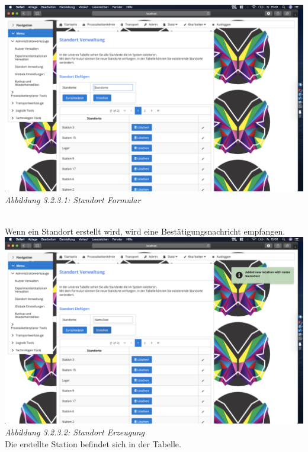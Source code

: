 \documentclass[enabledeprecatedfontcommands,fontsize=12pt,paper=a4,twoside]{scrartcl}
\begin{document}
\hypertarget{sc3.1.4.1}{
\includegraphics[width=1\textwidth]{Screenshots/4StandOrtFormular.png}
\textit{Abbildung 3.2.3.1: Standort Formular}
} \\

Wenn ein Standort erstellt wird, wird eine Bestätigungsnachricht empfangen.\\

\hypertarget{sc3.1.4.2}{
\includegraphics[width=1\textwidth]{Screenshots/4BeschaenigungAddLocation.png}
\textit{Abbildung 3.2.3.2: Standort Erzeugung}
} \\
Die erstellte Station befindet sich in der Tabelle.\\
\end{document}
